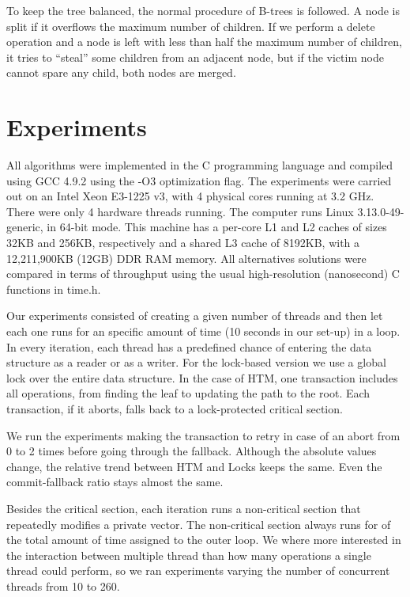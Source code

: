\documentclass{llncs}
\begin{document}
To keep the tree balanced, the normal procedure of B-trees is followed. A node is split if it overflows the maximum number of children. If we perform a delete operation and a node is left with less than half the maximum number of children, it tries to ``steal'' some children from an adjacent node, but if the victim node cannot spare any child, both nodes are merged.
\vspace{-2mm}
\section{Experiments}
\vspace{-4mm}
All algorithms were implemented in the C programming language and compiled using GCC 4.9.2 using the -O3 optimization flag. The experiments were carried out on an Intel Xeon E3-1225 v3, with 4 physical cores running at 3.2 GHz. There were only 4 hardware threads running. The computer runs Linux 3.13.0-49-generic, in 64-bit mode. This machine has a per-core L1 and L2 caches of sizes 32KB and 256KB, respectively and a shared L3 cache of 8192KB, with a 12,211,900KB (12GB) DDR RAM memory. All alternatives solutions were compared in terms of throughput using the usual high-resolution (nanosecond) C functions in time.h.

Our experiments consisted of creating a given number of threads and then let each one runs for an specific amount of time (10 seconds in our set-up) in a loop. In every iteration, each thread has a predefined chance of entering the data structure as a reader or as a writer. For the lock-based version we use a global lock over the entire data structure. In the case of HTM, one transaction includes all operations, from finding the leaf to updating the path to the root. Each transaction, if it aborts, falls back to a lock-protected critical section.

We run the experiments making the transaction to retry in case of an abort from 0 to 2 times before going through the fallback. Although the absolute values change, the relative trend between HTM and Locks keeps the same. Even the commit-fallback ratio stays almost the same.

Besides the critical section, each iteration runs a non-critical section that repeatedly modifies a private vector. The non-critical section always runs for  of the total amount of time assigned to the outer loop. We where more interested in the interaction between multiple thread than how many operations a single thread could perform, so we ran experiments varying the number of concurrent threads from 10 to 260.
\end{document}
